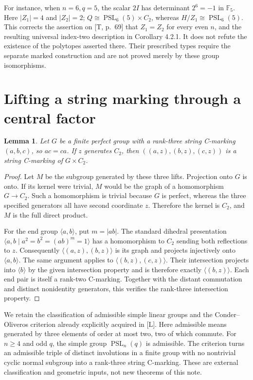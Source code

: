 \documentclass[11pt,a4paper]{article}
\newtheorem{lemma}[theorem]{Lemma}
\newcommand{\PSL}{\operatorname{PSL}}
\newcommand{\F}{\mathbb F}
\begin{document}
For instance, when $n=6,q=5$, the scalar $2I$ has determinant
$2^6=-1$ in $\F_5$. Here $|Z_1|=4$ and $|Z_2|=2$;
$Q\cong\PSL_6(5)\times C_2$, whereas $H/Z_1\cong\PSL_6(5)$.
This corrects the assertion on [T, p.~69] that $Z_1=Z_2$ for every
even $n$, and the resulting universal index-two description in
Corollary 4.2.1. It does not refute the existence of the polytopes
asserted there. Their prescribed types require the separate marked
construction and are not proved merely by these group isomorphisms.

\section{Lifting a string marking through a central factor}
\begin{lemma}\label{lift}
Let $G$ be a finite perfect group with a rank-three string C-marking
$(a,b,c)$, so $ac=ca$. If $z$ generates $C_2$, then
$((a,z),(b,z),(c,z))$ is a string C-marking of $G\times C_2$.
\end{lemma}
\begin{proof}
Let $M$ be the subgroup generated by these three lifts. Projection
onto $G$ is onto. If its kernel were trivial, $M$ would be the graph
of a homomorphism $G\to C_2$. Such a homomorphism is trivial because
$G$ is perfect, whereas the three specified generators all have
second coordinate $z$. Therefore the kernel is $C_2$, and $M$ is
the full direct product.

For the end group $\langle a,b\rangle$, put $m=|ab|$.
The standard dihedral presentation
$\langle a,b\mid a^2=b^2=(ab)^m=1\rangle$ has a homomorphism
to $C_2$ sending both reflections to $z$. Consequently
$\langle(a,z),(b,z)\rangle$ is its graph and projects injectively
onto $\langle a,b\rangle$. The same argument applies to
$\langle(b,z),(c,z)\rangle$. Their intersection projects into
$\langle b\rangle$ by the given intersection property and is
therefore exactly $\langle(b,z)\rangle$. Each end pair is itself
a rank-two C-marking. Together with the distant commutation and
distinct nonidentity generators, this verifies the rank-three
intersection property.
\end{proof}

We retain the classification of admissible simple linear groups and
the Conder--Oliveros criterion already explicitly acquired in [L].
Here admissible means generated by three elements of order at most two,
two of which commute. For $n\geq4$ and odd $q$, the simple group
$\PSL_n(q)$ is admissible. The criterion turns an admissible triple
of distinct involutions in a finite group with no nontrivial cyclic
normal subgroup into a rank-three string C-marking. These are external
classification and geometric inputs, not new theorems of this note.
\end{document}
